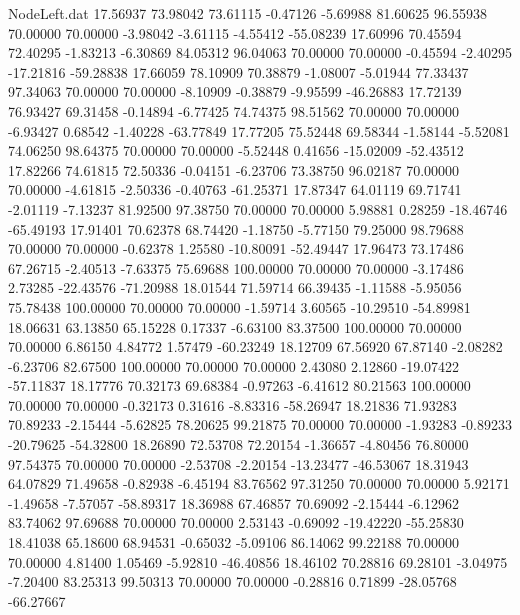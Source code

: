 \begin{filecontents}{NodeLeft.dat}
  17.56937   73.98042   73.61115    -0.47126   -5.69988   81.60625   96.55938   70.00000   70.00000   -3.98042   -3.61115   -4.55412  -55.08239
  17.60996   70.45594   72.40295    -1.83213   -6.30869   84.05312   96.04063   70.00000   70.00000   -0.45594   -2.40295  -17.21816  -59.28838
  17.66059   78.10909   70.38879    -1.08007   -5.01944   77.33437   97.34063   70.00000   70.00000   -8.10909   -0.38879   -9.95599  -46.26883
  17.72139   76.93427   69.31458    -0.14894   -6.77425   74.74375   98.51562   70.00000   70.00000   -6.93427    0.68542   -1.40228  -63.77849
  17.77205   75.52448   69.58344    -1.58144   -5.52081   74.06250   98.64375   70.00000   70.00000   -5.52448    0.41656  -15.02009  -52.43512
  17.82266   74.61815   72.50336    -0.04151   -6.23706   73.38750   96.02187   70.00000   70.00000   -4.61815   -2.50336   -0.40763  -61.25371
  17.87347   64.01119   69.71741    -2.01119   -7.13237   81.92500   97.38750   70.00000   70.00000    5.98881    0.28259  -18.46746  -65.49193
  17.91401   70.62378   68.74420    -1.18750   -5.77150   79.25000   98.79688   70.00000   70.00000   -0.62378    1.25580  -10.80091  -52.49447
  17.96473   73.17486   67.26715    -2.40513   -7.63375   75.69688  100.00000   70.00000   70.00000   -3.17486    2.73285  -22.43576  -71.20988
  18.01544   71.59714   66.39435    -1.11588   -5.95056   75.78438  100.00000   70.00000   70.00000   -1.59714    3.60565  -10.29510  -54.89981
  18.06631   63.13850   65.15228     0.17337   -6.63100   83.37500  100.00000   70.00000   70.00000    6.86150    4.84772    1.57479  -60.23249
  18.12709   67.56920   67.87140    -2.08282   -6.23706   82.67500  100.00000   70.00000   70.00000    2.43080    2.12860  -19.07422  -57.11837
  18.17776   70.32173   69.68384    -0.97263   -6.41612   80.21563  100.00000   70.00000   70.00000   -0.32173    0.31616   -8.83316  -58.26947
  18.21836   71.93283   70.89233    -2.15444   -5.62825   78.20625   99.21875   70.00000   70.00000   -1.93283   -0.89233  -20.79625  -54.32800
  18.26890   72.53708   72.20154    -1.36657   -4.80456   76.80000   97.54375   70.00000   70.00000   -2.53708   -2.20154  -13.23477  -46.53067
  18.31943   64.07829   71.49658    -0.82938   -6.45194   83.76562   97.31250   70.00000   70.00000    5.92171   -1.49658   -7.57057  -58.89317
  18.36988   67.46857   70.69092    -2.15444   -6.12962   83.74062   97.69688   70.00000   70.00000    2.53143   -0.69092  -19.42220  -55.25830
  18.41038   65.18600   68.94531    -0.65032   -5.09106   86.14062   99.22188   70.00000   70.00000    4.81400    1.05469   -5.92810  -46.40856
  18.46102   70.28816   69.28101    -3.04975   -7.20400   83.25313   99.50313   70.00000   70.00000   -0.28816    0.71899  -28.05768  -66.27667

\end{filecontents}
